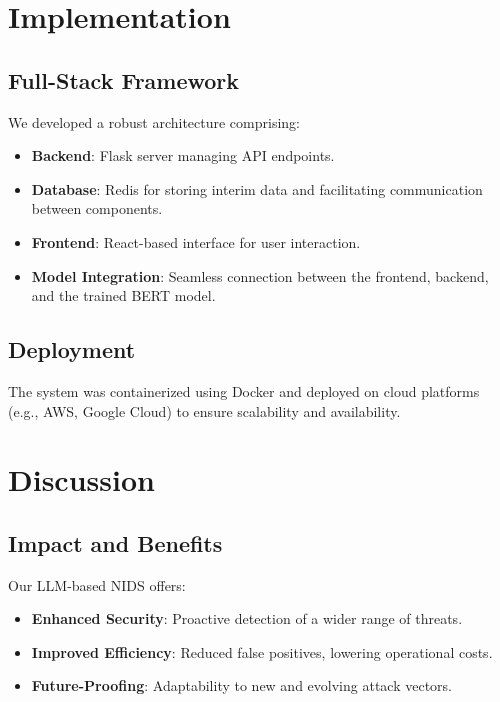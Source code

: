 \documentclass[12pt]{article}
\begin{document}
\section{Implementation}

\subsection{Full-Stack Framework}

We developed a robust architecture comprising:

\begin{itemize}
    \item \textbf{Backend}: Flask server managing API endpoints.
    \item \textbf{Database}: Redis for storing interim data and facilitating communication between components.
    \item \textbf{Frontend}: React-based interface for user interaction.
    \item \textbf{Model Integration}: Seamless connection between the frontend, backend, and the trained BERT model.
\end{itemize}

\subsection{Deployment}

The system was containerized using Docker and deployed on cloud platforms (e.g., AWS, Google Cloud) to ensure scalability and availability.

\section{Discussion}

\subsection{Impact and Benefits}

Our LLM-based NIDS offers:

\begin{itemize}
    \item \textbf{Enhanced Security}: Proactive detection of a wider range of threats.
    \item \textbf{Improved Efficiency}: Reduced false positives, lowering operational costs.
    \item \textbf{Future-Proofing}: Adaptability to new and evolving attack vectors.
\end{itemize}
\end{document}
